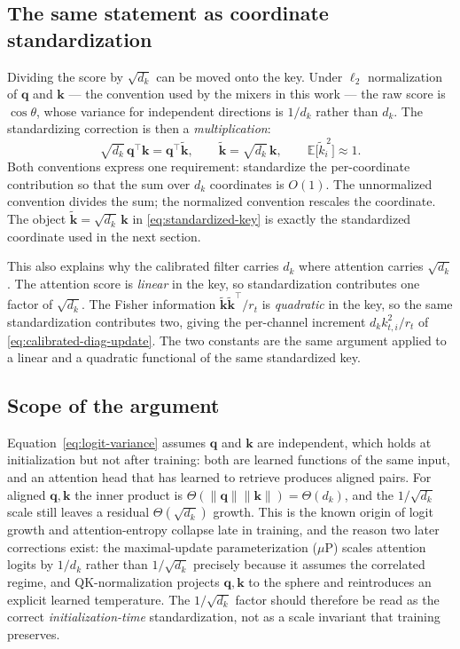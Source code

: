 \documentclass[11pt]{article}
\newcommand{\ve}[1]{\boldsymbol{#1}}
\newcommand{\tr}{\intercal}
\begin{document}
\subsection*{The same statement as coordinate standardization}

Dividing the score by $\sqrt{d_k}$ can be moved onto the key. Under $\ell_2$ normalization of
$\ve{q}$ and $\ve{k}$ --- the convention used by the mixers in this work --- the raw score is
$\cos\theta$, whose variance for independent directions is $1/d_k$ rather than $d_k$. The
standardizing correction is then a \emph{multiplication}:
\begin{equation}
  \sqrt{d_k}\,\ve{q}^{\tr}\ve{k}
  =\ve{q}^{\tr}\widetilde{\ve{k}},
  \qquad
  \widetilde{\ve{k}}=\sqrt{d_k}\,\ve{k},
  \qquad
  \mathbb{E}\big[\widetilde k_i^{\,2}\big]\approx 1.
  \label{eq:standardized-key}
\end{equation}
Both conventions express one requirement: standardize the per-coordinate contribution so that the
sum over $d_k$ coordinates is $O(1)$. The unnormalized convention divides the sum; the normalized
convention rescales the coordinate. The object $\widetilde{\ve{k}}=\sqrt{d_k}\,\ve{k}$ in
\eqref{eq:standardized-key} is exactly the standardized coordinate used in the next section.

This also explains why the calibrated filter carries $d_k$ where attention carries $\sqrt{d_k}$.
The attention score is \emph{linear} in the key, so standardization contributes one factor of
$\sqrt{d_k}$. The Fisher information $\widetilde{\ve{k}}\widetilde{\ve{k}}^{\tr}/r_t$ is
\emph{quadratic} in the key, so the same standardization contributes two, giving the per-channel
increment $d_kk_{t,i}^2/r_t$ of \eqref{eq:calibrated-diag-update}. The two constants are the same
argument applied to a linear and a quadratic functional of the same standardized key.

\subsection*{Scope of the argument}

Equation~\eqref{eq:logit-variance} assumes $\ve{q}$ and $\ve{k}$ are independent, which holds at
initialization but not after training: both are learned functions of the same input, and an
attention head that has learned to retrieve produces aligned pairs. For aligned $\ve{q},\ve{k}$ the
inner product is $\Theta(\|\ve{q}\|\|\ve{k}\|)=\Theta(d_k)$, and the $1/\sqrt{d_k}$ scale still
leaves a residual $\Theta(\sqrt{d_k})$ growth. This is the known origin of logit growth and
attention-entropy collapse late in training, and the reason two later corrections exist: the
maximal-update parameterization ($\mu$P) scales attention logits by $1/d_k$ rather than
$1/\sqrt{d_k}$ precisely because it assumes the correlated regime, and QK-normalization projects
$\ve{q},\ve{k}$ to the sphere and reintroduces an explicit learned temperature. The
$1/\sqrt{d_k}$ factor should therefore be read as the correct \emph{initialization-time}
standardization, not as a scale invariant that training preserves.
\end{document}
